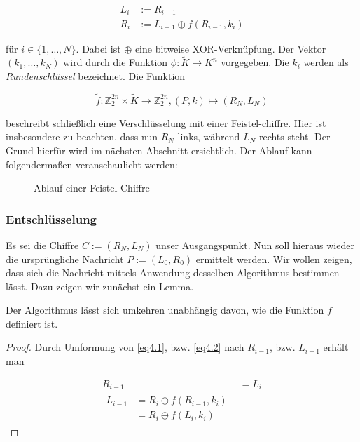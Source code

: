 \documentclass[
10pt, %
a4paper, %
oneside, %
headinclude,footinclude, %
BCOR5mm, %
]{scrartcl}
\begin{document}
	\begin{align} 
		L_i &:= R_{i-1}\label{eq4.1} \\
		R_i &:= L_{i-1} \oplus f(R_{i-1}, k_i) \label{eq4.2}
	\end{align}
	
	für $i \in \{1, \dots, N \}$. Dabei ist $\oplus$ eine bitweise XOR-Verknüpfung. Der Vektor $(k_1, \dots, k_N)$ wird durch die Funktion $\phi : \tilde{K} \rightarrow K^n$ vorgegeben. Die $k_i$ werden als \emph{Rundenschlüssel} bezeichnet. Die Funktion

	$$ \tilde{f}: \mathbb{Z}_{2}^{2n} \times \tilde{K} 
	\rightarrow \mathbb{Z}^{2n}_2, (P,k) \mapsto (R_N, L_N) $$
	
	beschreibt schließlich eine Verschlüsselung mit einer Feistel-chiffre. \cite[51]{2} Hier ist insbesondere zu beachten, dass nun $R_N$ links, während $L_N$ rechts steht. Der Grund hierfür wird im nächsten Abschnitt ersichtlich. Der Ablauf kann folgendermaßen veranschaulicht werden: 

	\begin{figure}[ht]
	\centering
	
	\label{fig:feistel}
	\caption[Ablauf einer Feistel-Chiffre] {Ablauf einer Feistel-Chiffre \cite[128]{3}}
	
	\end{figure}


	\subsubsection{Entschlüsselung}
	Es sei die Chiffre $C := (R_N, L_N)$ unser Ausgangspunkt. Nun soll hieraus wieder die ursprüngliche Nachricht $P := (L_0, R_0)$ ermittelt werden. Wir wollen zeigen, dass sich die Nachricht mittels Anwendung desselben Algorithmus bestimmen lässt. Dazu zeigen wir zunächst ein Lemma.
	
	\begin{lemma}
		Der Algorithmus lässt sich umkehren unabhängig davon, wie die Funktion $f$ definiert ist.
	\label{l1}
	\end{lemma}

	\begin{proof}
	Durch Umformung von \ref{eq4.1}, bzw. \ref{eq4.2} nach $R_{i-1}$, bzw. $L_{i-1}$ erhält man

	\begin{align}
		R_{i-1} &= L_i \label{eq4.3} \\
		\begin{split}
		L_{i-1} &= R_i \oplus f(R_{i-1}, k_i) \\ 
				&= R_i \oplus f(L_i, k_i) \label{eq4.4}
		\end{split}
	\end{align}
		
	\end{proof}
\end{document}
